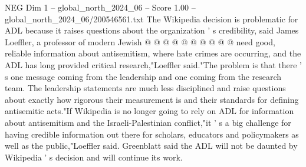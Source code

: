 \begin{textsample}{NEG Dim 1 – global\_north\_2024\_06 – Score 1.00 – global\_north\_2024\_06/200546561.txt}
The Wikipedia decision is problematic for ADL because it raises questions about the organization ' s credibility, said James Loeffler, a professor of modern Jewish @ @ @ @ @ @ @ @ @ @ need good, reliable information about antisemitism, where hate crimes are occurring, and the ADL has long provided critical research,"Loeffler said."The problem is that there ' s one message coming from the leadership and one coming from the research team.
The leadership statements are much less disciplined and raise questions about exactly how rigorous their measurement is and their standards for defining antisemitic acts."If Wikipedia is no longer going to rely on ADL for information about antisemitism and the Israeli-Palestinian conflict,"it ' s a big challenge for having credible information out there for scholars, educators and policymakers as well as the public,"Loeffler said.
Greenblatt said the ADL will not be daunted by Wikipedia ' s decision and will continue its work.

\end{textsample}
